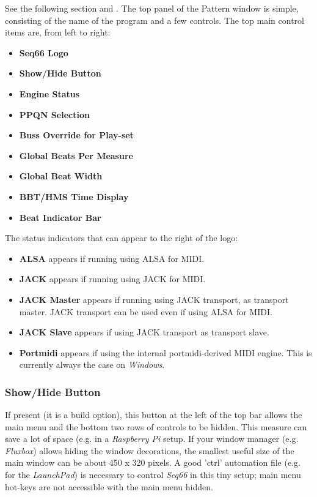    See the following section and
   .
   The top panel of the Pattern window is simple, consisting of the
   name of the program and a few controls.
   The top main control items are, from left to right:

   \begin{itemize}
      \item \textbf{Seq66 Logo}
      \item \textbf{Show/Hide Button}
      \item \textbf{Engine Status}
      \item \textbf{PPQN Selection}
      \item \textbf{Buss Override for Play-set}
      \item \textbf{Global Beats Per Measure}
      \item \textbf{Global Beat Width}
      \item \textbf{BBT/HMS Time Display}
      \item \textbf{Beat Indicator Bar}
   \end{itemize}

   The status indicators that can appear to the right of the logo:

   \begin{itemize}
      \item \textbf{ALSA} appears if running using ALSA for MIDI.
      \item \textbf{JACK} appears if running using JACK for MIDI.
      \item \textbf{JACK Master} appears if running using JACK transport, as
         transport master.
         JACK transport can be used even if using ALSA for MIDI.
      \item \textbf{JACK Slave} appears if using JACK transport as
         transport slave.
      \item \textbf{Portmidi} appears if using the internal portmidi-derived
         MIDI engine.  This is currently always the case on \textsl{Windows}.
   \end{itemize}

\subsubsection{Show/Hide Button}
\label{subsubsec:introduction_show_hide_button}

   If present (it is a build option),
   this button at the left of the top bar
   allows the main menu and the bottom two
   rows of controls to be hidden.
   This measure can save a lot of space (e.g. in a \textsl{Raspberry Pi}
   setup.
   If your window manager (e.g. \textsl{Fluxbox})
   allows hiding the window decorations, the smallest useful size of the
   main window can be about 450 x 320 pixels.
   A good 'ctrl' automation file (e.g. for the \textsl{LaunchPad})
   is necessary to control \textsl{Seq66} in this tiny setup;
   main menu hot-keys are not accessible with the main menu hidden.

